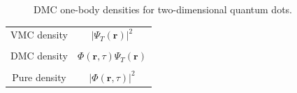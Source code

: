 \begin{frame}
\begin{figure}
\begin{center}
  \caption{DMC one-body densities for two-dimensional quantum dots.}
  \label{fig:OBD_DMC_QDOTS_w1} 
 \end{center}
\end{figure}
 \end{frame}

\begin{frame}

\begin{center}
\begin{tabular}{cc}
VMC density & $|\Psi_T(\mathbf{r})|^2$ \\
&  \\
DMC density & $\Phi(\mathbf{r}, \tau)\Psi_T(\mathbf{r})$ \\
&  \\
Pure density & $|\Phi(\mathbf{r}, \tau)|^2$  
\end{tabular}
\end{center}

\end{frame}
 
